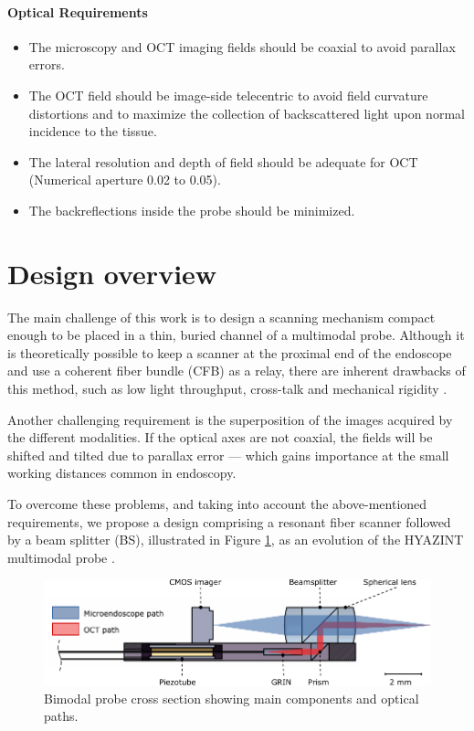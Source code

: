 \paragraph{Optical Requirements}

\begin{itemize}
\item The microscopy and OCT imaging fields should be coaxial to avoid parallax errors. 
\item The OCT field should be image-side telecentric to avoid field curvature distortions and to maximize the collection of backscattered light upon normal incidence to the tissue.
\item The lateral resolution and depth of field should be adequate for OCT (Numerical aperture 0.02 to 0.05).
\item The backreflections inside the probe should be minimized.
\end{itemize}

  

\section{Design overview}

The main challenge of this work is to design a scanning mechanism compact enough to be placed in a thin, buried channel of a multimodal probe. 
Although it is theoretically possible to keep a scanner at the proximal end of the endoscope and use a coherent fiber bundle (CFB) as a relay, there are inherent drawbacks of this method, such as low light throughput, cross-talk and mechanical rigidity \cite{Ford2009}. 

Another challenging requirement is the superposition of the images acquired by the different modalities. If the optical axes are not coaxial, the fields will be shifted and tilted due to parallax error --- which gains importance at the small working distances common in endoscopy.

To overcome these problems, and taking into account the above-mentioned requirements, we propose a design comprising a resonant fiber scanner followed by a beam splitter (BS), illustrated in Figure \ref{fig:bimodalSketch}, as an evolution of the HYAZINT multimodal probe \cite{Kretschmer}.

\begin{figure}[h!]\centering
      \includegraphics{figures/10_Introduction/bimodalSketch/out.pdf}
      \caption{Bimodal probe cross section showing main components and optical paths.}
      \label{fig:bimodalSketch}
\end{figure}

